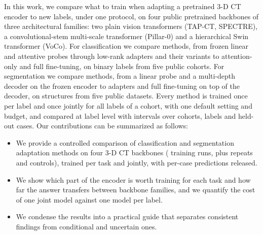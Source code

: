 In this work, we compare what to train when adapting a pretrained 3-D CT encoder to new labels, under one protocol, on four public pretrained backbones of three architectural families: two plain vision transformers (TAP-CT, SPECTRE), a convolutional-stem multi-scale transformer (Pillar-0) and a hierarchical Swin transformer (VoCo). For classification we compare \numClsMethodsN{} methods, from frozen linear and attentive probes through low-rank adapters and their variants to attention-only and full fine-tuning, on \numLabelsN{} binary labels from five public cohorts. For segmentation we compare \numSegMethodsN{} methods, from a linear probe and a multi-depth decoder on the frozen encoder to adapters and full fine-tuning on top of the decoder, on \numStructuresN{} structures from five public datasets. Every method is trained once per label and once jointly for all labels of a cohort, with one default setting and budget, and compared at label level with intervals over cohorts, labels and held-out cases. Our contributions can be summarized as follows:
\begin{itemize}\setlength{\itemsep}{1pt}
  \item We provide a controlled comparison of \numClsMethodsN{} classification and \numSegMethodsN{} segmentation adaptation methods on four 3-D CT backbones (\numRunsMainN{} training runs, plus \numRunsRevisionN{} repeats and controls), trained per task and jointly, with per-case predictions released.
  \item We show which part of the encoder is worth training for each task and how far the answer transfers between backbone families, and we quantify the cost of one joint model against one model per label.
  \item We condense the results into a practical guide that separates consistent findings from conditional and uncertain ones.
\end{itemize}
